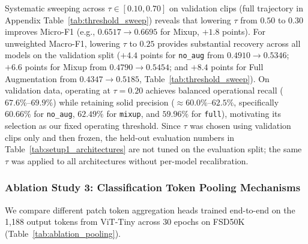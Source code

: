\documentclass[11pt,a4paper]{article}
\begin{document}
Systematic sweeping across $\tau \in [0.10, 0.70]$ on validation clips (full trajectory in Appendix Table~\ref{tab:threshold_sweep}) reveals that lowering $\tau$ from $0.50$ to $0.30$ improves Micro-F1 (e.g., $0.6517 \to 0.6695$ for Mixup, $+1.8$ points). For unweighted Macro-F1, lowering $\tau$ to $0.25$ provides substantial recovery across all models on the validation split ($+4.4$ points for \texttt{no\_aug} from $0.4910 \to 0.5346$; $+6.6$ points for Mixup from $0.4790 \to 0.5454$; and $+8.4$ points for Full Augmentation from $0.4347 \to 0.5185$, Table~\ref{tab:threshold_sweep}). On validation data, operating at $\tau = 0.20$ achieves balanced operational recall ($67.6\%\text{--}69.9\%$) while retaining solid precision ($\approx 60.0\%\text{--}62.5\%$, specifically $60.66\%$ for \texttt{no\_aug}, $62.49\%$ for \texttt{mixup}, and $59.96\%$ for \texttt{full}), motivating its selection as our fixed operating threshold. Since $\tau$ was chosen using validation clips only and then frozen, the held-out evaluation numbers in Table~\ref{tab:setup1_architectures} are not tuned on the evaluation split; the same $\tau$ was applied to all architectures without per-model recalibration.

\subsubsection{Ablation Study 3: Classification Token Pooling Mechanisms}
\label{sec:pooling_ablation}
We compare different patch token aggregation heads trained end-to-end on the 1,188 output tokens from ViT-Tiny across 30 epochs on FSD50K (Table~\ref{tab:ablation_pooling}).

\begin{table}[htbp]
\centering
\caption{Setup 3.3: Token Pooling Mechanism Ablation on Held-Out FSD50K (10,231 Evaluation Clips, ViT-Tiny Backbone). Dual-Token ($\text{CLS}+\text{DIST}$) reflects the standard AST baseline; GAP, GAP+Max, and Learned Attention Pooling were trained under an identical end-to-end recipe.}
\label{tab:ablation_pooling}
\vspace{2mm}
\end{table}
\end{document}
